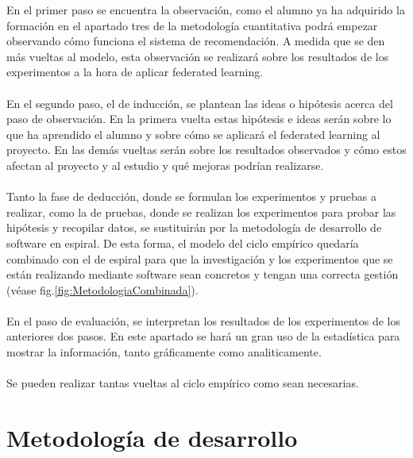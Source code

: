 En el primer paso se encuentra la observación, como el alumno ya ha adquirido la formación en el apartado tres de la metodología cuantitativa podrá empezar observando cómo funciona el sistema de recomendación. A medida que se den más vueltas al modelo, esta observación se realizará sobre los resultados de los experimentos a la hora de aplicar federated learning.
\\ \\
En el segundo paso, el de inducción, se plantean las ideas o hipótesis acerca del paso de observación. En la primera vuelta estas hipótesis e ideas serán sobre lo que ha aprendido el alumno y sobre cómo se aplicará el federated learning al proyecto. En las demás vueltas serán sobre los resultados observados y cómo estos afectan al proyecto y al estudio y qué mejoras podrían realizarse. 
\\ \\
Tanto la fase de deducción, donde se formulan los experimentos y pruebas a realizar, como la de pruebas, donde se realizan los experimentos para probar las hipótesis y recopilar datos, se sustituirán por la metodología de desarrollo de software en espiral. De esta forma, el modelo del ciclo empírico quedaría combinado con el de espiral para que la investigación y los experimentos que se están realizando mediante software sean concretos y tengan una correcta gestión (véase fig.\ref{fig:MetodologiaCombinada}). 
\\ \\
En el paso de evaluación, se interpretan los resultados de los experimentos de los anteriores dos pasos. En este apartado se hará un gran uso de  la estadística para mostrar la información, tanto gráficamente como analiticamente.
\\ \\
Se pueden realizar tantas vueltas al ciclo empírico como sean necesarias.

\section{Metodología de desarrollo}

